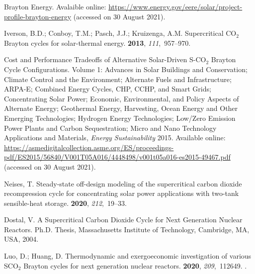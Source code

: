 \documentclass[sustainability,article,accept,moreauthors,pdftex]{Definitions/mdpi}
\begin{document}
\begin{thebibliography}{999}
Brayton Energy.
\newblock
 Avalaible online:  \url{https://www.energy.gov/eere/solar/project-profile-brayton-energy} (accessed
  on 30 August 2021).

Iverson, B.D.; Conboy, T.M.; Pasch, J.J.; Kruizenga, A.M.
\newblock Supercritical CO$_2$ Brayton cycles for solar-thermal energy.
 {\bf 2013}, {\em 111},~957--970.

{ {Cost and Performance Tradeoffs of Alternative Solar-Driven S-CO$_2$ Brayton
  Cycle Configurations}}. Volume 1: Advances in Solar Buildings and
  Conservation; Climate Control and the Environment; Alternate Fuels and
  Infrastructure; ARPA-E; Combined Energy Cycles, CHP, CCHP, and Smart Grids;
  Concentrating Solar Power; Economic, Environmental, and Policy Aspects of
  Alternate Energy; Geothermal Energy, Harvesting, Ocean Energy and Other
  Emerging Technologies; Hydrogen Energy Technologies; Low/Zero Emission Power
  Plants and Carbon Sequestration; Micro and Nano Technology Applications and
  Materials, {\em Energy Sustainability}  2015.  Available online: 
  \href{http://xxx.lanl.gov/abs/https://asmedigitalcollection.asme.org/ES/proceedings-pdf/ES2015/56840/V001T05A016/4448498/v001t05a016-es2015-49467.pdf}{{\normalfont
  https://asmedigitalcollection.asme.org/ES/proceedings-pdf/ES2015/56840/V001T05A016/4448498/v001t05a016-es2015-49467.pdf}} (accessed
  on 30 August 2021).

Neises, T.
\newblock Steady-state off-design modeling of the supercritical carbon dioxide
  recompression cycle for concentrating solar power applications with two-tank
  sensible-heat storage.
 {\bf 2020}, {\em 212},~19--33.

Dostal, V.
\newblock A Supercritical Carbon Dioxide Cycle for Next Generation Nuclear
  Reactors.
\newblock Ph.D. Thesis, Massachusetts Institute of Technology, Cambridge, MA, USA, 2004.

Luo, D.; Huang, D.
\newblock Thermodynamic and exergoeconomic investigation of various SCO$_2$
  Brayton cycles for next generation nuclear reactors.
 {\bf 2020}, {\em 209},~112649.
\newblock
  {\href{https://doi.org/https://doi.org/10.1016/j.enconman.2020.112649}{}}.


\end{thebibliography}
\end{document}
